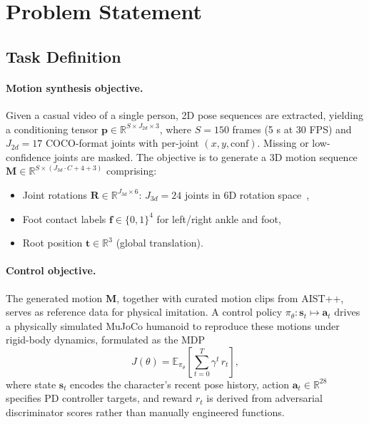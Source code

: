 \section{Problem Statement}
\label{sec:statement}

\subsection{Task Definition}
\paragraph{Motion synthesis objective.}
Given a casual video of a single person, 2D pose sequences are extracted, yielding a conditioning tensor $\mathbf{p} \in \mathbb{R}^{S \times J_{2d} \times 3}$, where $S = 150$ frames (5 s at 30 FPS) and $J_{2d} = 17$ COCO-format joints with per-joint $(x, y, \mathrm{conf})$. Missing or low-confidence joints are masked. The objective is to generate a 3D motion sequence $\mathbf{M} \in \mathbb{R}^{S \times (J_{3d} \cdot C + 4 + 3)}$ comprising:
\begin{itemize}
    \item Joint rotations $\mathbf{R} \in \mathbb{R}^{J_{3d} \times 6}$: $J_{3d} = 24$ joints in 6D rotation space~\cite{6drot2020},
    \item Foot contact labels $\mathbf{f} \in \{0,1\}^4$ for left/right ankle and foot,
    \item Root position $\mathbf{t} \in \mathbb{R}^3$ (global translation).
\end{itemize}

\paragraph{Control objective.}
The generated motion $\mathbf{M}$, together with curated motion clips from AIST++, serves as reference data for physical imitation. A control policy $\pi_\theta : \mathbf{s}_t \mapsto \mathbf{a}_t$ drives a physically simulated MuJoCo humanoid to reproduce these motions under rigid-body dynamics, formulated as the MDP
\[
    J(\theta) = \mathbb{E}_{\pi_\theta}\!\left[\sum_{t=0}^{T} \gamma^t\, r_t\right],
\]
where state $\mathbf{s}_t$ encodes the character's recent pose history, action $\mathbf{a}_t \in \mathbb{R}^{28}$ specifies PD controller targets, and reward $r_t$ is derived from adversarial discriminator scores rather than manually engineered functions.


